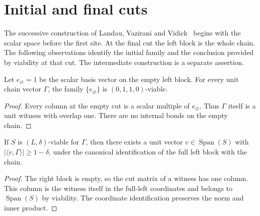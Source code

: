 \section{Initial and final cuts}
\label{sec:lvv_endpoints}

The successive construction of Landau, Vazirani and
Vidick~\cite{Landau2015Polynomial} begins with the scalar space before
the first site. At the final cut the left block is the whole chain.
The following observations identify the initial family and the conclusion
provided by viability at that cut. The intermediate construction is a
separate assertion.

\begin{lemma}
    \label{lem:lvv_initial_scalar_family}
    \leanok
    Let $e_{\varnothing}=1$ be the scalar basis vector on the empty
    left block. For every unit chain vector $\Gamma$, the family
    $\{e_{\varnothing}\}$ is $(0,1,1,0)$-viable.
\end{lemma}
\begin{proof}
    \leanok
    Every column at the empty cut is a scalar multiple of
    $e_{\varnothing}$. Thus $\Gamma$ itself is a unit witness with
    overlap one. There are no internal bonds on the empty chain.
\end{proof}

\begin{lemma}
    \label{lem:lvv_final_span_vector}
    \leanok
    If $S$ is $(L,\delta)$-viable for $\Gamma$, then there exists
    a unit vector $v\in\operatorname{Span}(S)$ with
    $|\langle v,\Gamma\rangle|\ge 1-\delta$, under the canonical
    identification of the full left block with the chain.
\end{lemma}
\begin{proof}
    \leanok
    The right block is empty, so the cut matrix of a witness has one
    column. This column is the witness itself in the full-left
    coordinates and belongs to $\operatorname{Span}(S)$ by viability.
    The coordinate identification preserves the norm and inner product.
\end{proof}
